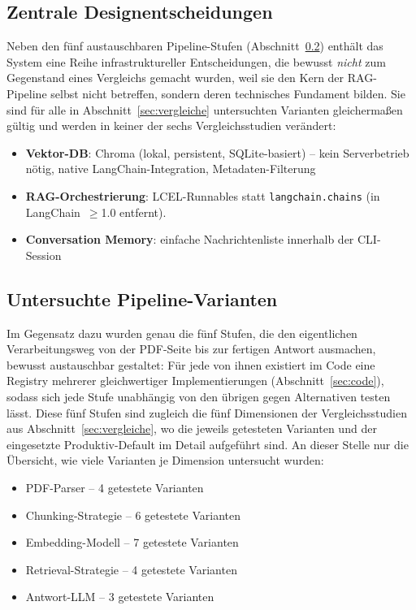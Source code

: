 \documentclass[11pt,a4paper]{article}
\begin{document}
\subsection{Zentrale Designentscheidungen}

Neben den fünf austauschbaren Pipeline-Stufen (Abschnitt~\ref{sec:untersuchte-varianten})
enthält das System eine Reihe infrastruktureller Entscheidungen, die
bewusst \emph{nicht} zum Gegenstand eines Vergleichs gemacht wurden, weil
sie den Kern der RAG-Pipeline selbst nicht betreffen, sondern deren
technisches Fundament bilden. Sie sind für alle in
Abschnitt~\ref{sec:vergleiche} untersuchten Varianten gleichermaßen
gültig und werden in keiner der sechs Vergleichsstudien verändert:

\begin{itemize}
    \item \textbf{Vektor-DB}: Chroma (lokal, persistent, SQLite-basiert) -- kein Serverbetrieb nötig, native LangChain-Integration, Metadaten-Filterung
    \item \textbf{RAG-Orchestrierung}: LCEL-Runnables statt \texttt{langchain.chains} (in LangChain~$\geq$1.0 entfernt).
    \item \textbf{Conversation Memory}: einfache Nachrichtenliste innerhalb der CLI-Session
\end{itemize}

\subsection{Untersuchte Pipeline-Varianten}
\label{sec:untersuchte-varianten}

Im Gegensatz dazu wurden genau die fünf Stufen, die den eigentlichen
Verarbeitungsweg von der PDF-Seite bis zur fertigen Antwort ausmachen,
bewusst austauschbar gestaltet: Für jede von ihnen existiert im Code eine
Registry mehrerer gleichwertiger Implementierungen (Abschnitt~\ref{sec:code}),
sodass sich jede Stufe unabhängig von den übrigen gegen Alternativen testen
lässt. Diese fünf Stufen sind zugleich die fünf Dimensionen der
Vergleichsstudien aus Abschnitt~\ref{sec:vergleiche}, wo die jeweils
getesteten Varianten und der eingesetzte Produktiv-Default im Detail
aufgeführt sind. An dieser Stelle nur die Übersicht, wie viele Varianten
je Dimension untersucht wurden:

\begin{itemize}
    \item PDF-Parser -- 4 getestete Varianten
    \item Chunking-Strategie -- 6 getestete Varianten
    \item Embedding-Modell -- 7 getestete Varianten
    \item Retrieval-Strategie -- 4 getestete Varianten
    \item Antwort-LLM -- 3 getestete Varianten
\end{itemize}
\end{document}
